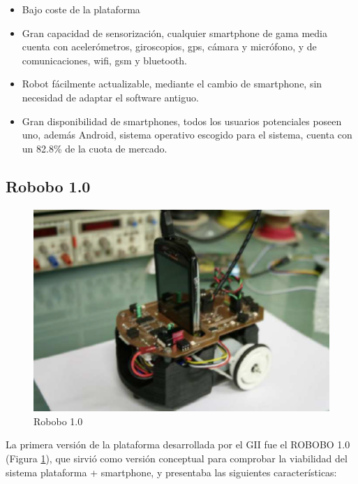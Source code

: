  \begin{itemize}
 	\item Bajo coste de la plataforma
 	\item Gran capacidad de sensorización, cualquier smartphone de gama media cuenta con acelerómetros, giroscopios, gps, cámara y micrófono, y de comunicaciones, wifi, gsm y bluetooth.
 	\item Robot fácilmente actualizable, mediante el cambio de smartphone, sin necesidad de adaptar el software antiguo.
 	\item Gran disponibilidad de smartphones, todos los usuarios potenciales poseen uno, además Android, sistema operativo escogido para el sistema, cuenta con un 82.8\% de la cuota de mercado.
 \end{itemize}

\subsection{Robobo 1.0}
\begin{figure}
	\centering
	\includegraphics[width=0.8\linewidth]{imagenes/robobo1_0.PNG}
	\caption{Robobo 1.0}
	\label{fig:robobo_1_0}
\end{figure}

La primera versión de la plataforma  desarrollada por el GII fue el ROBOBO 1.0 (Figura \ref{fig:robobo_1_0}), que sirvió como versión conceptual para comprobar la viabilidad del sistema plataforma + smartphone, y presentaba las siguientes características:

